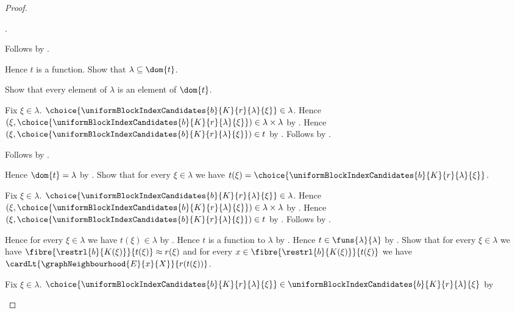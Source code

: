 \begin{proof}
\begin{subproof}
\begin{subproof}
                .
        \end{subproof}
        Follows by .
    \end{subproof}
    Hence $t$ is a function.
    Show that $\lambda\subseteq\dom{t}$.
    \begin{subproof}
        Show that every element of $\lambda$ is an element of $\dom{t}$.
        \begin{subproof}
            Fix $\xi\in\lambda$.
            $\choice{\uniformBlockIndexCandidates
                {b}{K}{r}{\lambda}{\xi}}\in\lambda$.
            Hence $(\xi,\choice{\uniformBlockIndexCandidates
                {b}{K}{r}{\lambda}{\xi}})
                \in\lambda\times\lambda$ by .
            Hence $(\xi,\choice{\uniformBlockIndexCandidates
                {b}{K}{r}{\lambda}{\xi}})\in t$ by
                .
            Follows by .
        \end{subproof}
        Follows by .
    \end{subproof}
    Hence $\dom{t}=\lambda$ by .
    Show that for every $\xi\in\lambda$ we have
        $t(\xi)=\choice{\uniformBlockIndexCandidates
            {b}{K}{r}{\lambda}{\xi}}$.
    \begin{subproof}
        Fix $\xi\in\lambda$.
        $\choice{\uniformBlockIndexCandidates
            {b}{K}{r}{\lambda}{\xi}}\in\lambda$.
        Hence $(\xi,\choice{\uniformBlockIndexCandidates
            {b}{K}{r}{\lambda}{\xi}})
            \in\lambda\times\lambda$ by .
        Hence $(\xi,\choice{\uniformBlockIndexCandidates
            {b}{K}{r}{\lambda}{\xi}})\in t$ by
            .
        Follows by .
    \end{subproof}
    Hence for every $\xi\in\lambda$ we have $t(\xi)\in\lambda$ by
        \auto.
    Hence $t$ is a function to $\lambda$ by \auto.
    Hence $t\in\funs{\lambda}{\lambda}$ by .
    Show that for every $\xi\in\lambda$ we have
        $\fibre{\restrl{b}{K(\xi)}}{t(\xi)}\approx r(\xi)$ and
        for every $x\in\fibre{\restrl{b}{K(\xi)}}{t(\xi)}$ we have
            $\cardLt{\graphNeighbourhood{E}{x}{X}}{r(t(\xi))}$.
    \begin{subproof}
        Fix $\xi\in\lambda$.
        $\choice{\uniformBlockIndexCandidates{b}{K}{r}{\lambda}{\xi}}
        \in\uniformBlockIndexCandidates{b}{K}{r}{\lambda}{\xi}$ by

\end{subproof}
\end{proof}

